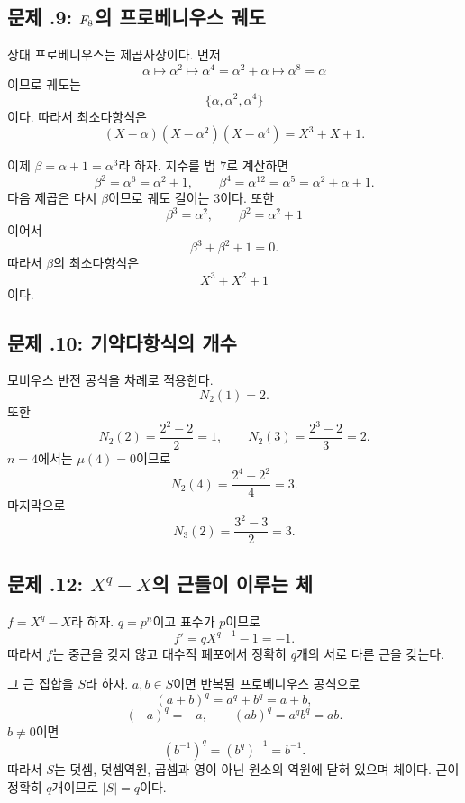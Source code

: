 \subsection*{문제 \thechapter.9: $F_8$의 프로베니우스 궤도}

\begin{solution}
상대 프로베니우스는 제곱사상이다. 먼저
\[
  \alpha\longmapsto\alpha^2
  \longmapsto\alpha^4=\alpha^2+\alpha
  \longmapsto\alpha^8=\alpha
\]
이므로 궤도는
\[
  \{\alpha,\alpha^2,\alpha^4\}
\]
이다. 따라서 최소다항식은
\[
  (X-\alpha)(X-\alpha^2)(X-\alpha^4)
  =X^3+X+1.
\]

이제 $\beta=\alpha+1=\alpha^3$라 하자. 지수를 법 $7$로 계산하면
\[
  \beta^2=\alpha^6=\alpha^2+1,
  \qquad
  \beta^4=\alpha^{12}=\alpha^5=\alpha^2+\alpha+1.
\]
다음 제곱은 다시 $\beta$이므로 궤도 길이는 $3$이다. 또한
\[
  \beta^3=\alpha^2,
  \qquad
  \beta^2=\alpha^2+1
\]
이어서
\[
  \beta^3+\beta^2+1=0.
\]
따라서 $\beta$의 최소다항식은
\[
  X^3+X^2+1
\]
이다.
\end{solution}

\subsection*{문제 \thechapter.10: 기약다항식의 개수}

\begin{solution}
모비우스 반전 공식을 차례로 적용한다.
\[
  N_2(1)=2.
\]
또한
\[
  N_2(2)=\frac{2^2-2}{2}=1,
  \qquad
  N_2(3)=\frac{2^3-2}{3}=2.
\]
$n=4$에서는 $\mu(4)=0$이므로
\[
  N_2(4)=\frac{2^4-2^2}{4}=3.
\]
마지막으로
\[
  N_3(2)=\frac{3^2-3}{2}=3.
\]
\end{solution}

\subsection*{문제 \thechapter.12: $X^q-X$의 근들이 이루는 체}

\begin{solution}
$f=X^q-X$라 하자. $q=p^n$이고 표수가 $p$이므로
\[
  f'=qX^{q-1}-1=-1.
\]
따라서 $f$는 중근을 갖지 않고 대수적 폐포에서 정확히 $q$개의 서로 다른 근을 갖는다.

그 근 집합을 $S$라 하자. $a,b\in S$이면 반복된 프로베니우스 공식으로
\[
  (a+b)^q=a^q+b^q=a+b,
\]
\[
  (-a)^q=-a,
  \qquad
  (ab)^q=a^qb^q=ab.
\]
$b\ne0$이면
\[
  (b^{-1})^q=(b^q)^{-1}=b^{-1}.
\]
따라서 $S$는 덧셈, 덧셈역원, 곱셈과 영이 아닌 원소의 역원에 닫혀 있으며 체이다. 근이 정확히 $q$개이므로 $|S|=q$이다.
\end{solution}

